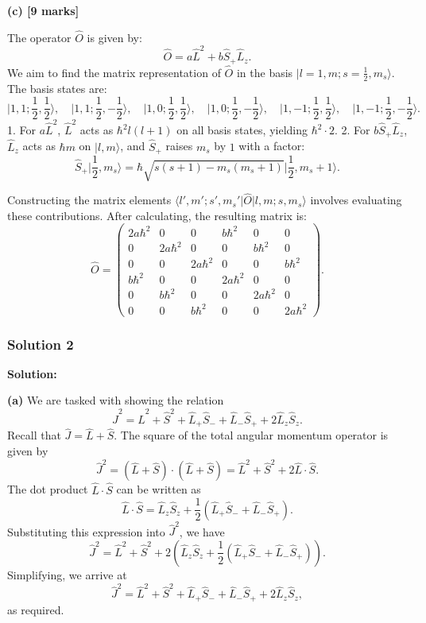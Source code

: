 \documentclass{article}
\begin{document}
\textbf{(c) [9 marks]}  

The operator $\hat{O}$ is given by:  
\[
\hat{O} = a \hat{L}^2 + b \hat{S}_+ \hat{L}_z.
\]  
We aim to find the matrix representation of $\hat{O}$ in the basis $\lvert l = 1, m; s = \frac{1}{2}, m_s \rangle$. The basis states are:  
\[
\lvert 1, 1; \frac{1}{2}, \frac{1}{2} \rangle, \quad \lvert 1, 1; \frac{1}{2}, -\frac{1}{2} \rangle, \quad \lvert 1, 0; \frac{1}{2}, \frac{1}{2} \rangle, \quad \lvert 1, 0; \frac{1}{2}, -\frac{1}{2} \rangle, \quad \lvert 1, -1; \frac{1}{2}, \frac{1}{2} \rangle, \quad \lvert 1, -1; \frac{1}{2}, -\frac{1}{2} \rangle.
\]  
1. For $a \hat{L}^2$, $\hat{L}^2$ acts as $\hbar^2 l(l+1)$ on all basis states, yielding $\hbar^2 \cdot 2$.  
2. For $b \hat{S}_+ \hat{L}_z$, $\hat{L}_z$ acts as $\hbar m$ on $\lvert l, m \rangle$, and $\hat{S}_+$ raises $m_s$ by $1$ with a factor:  
\[
\hat{S}_+ \lvert \frac{1}{2}, m_s \rangle = \hbar \sqrt{s(s+1) - m_s(m_s + 1)} \lvert \frac{1}{2}, m_s + 1 \rangle.
\]  

Constructing the matrix elements $\langle l', m'; s', m_s' \lvert \hat{O} \rvert l, m; s, m_s \rangle$ involves evaluating these contributions. After calculating, the resulting matrix is:  
\[
\hat{O} = 
\begin{pmatrix}
2a\hbar^2 & 0 & 0 & b\hbar^2 & 0 & 0 \\
0 & 2a\hbar^2 & 0 & 0 & b\hbar^2 & 0 \\
0 & 0 & 2a\hbar^2 & 0 & 0 & b\hbar^2 \\
b\hbar^2 & 0 & 0 & 2a\hbar^2 & 0 & 0 \\
0 & b\hbar^2 & 0 & 0 & 2a\hbar^2 & 0 \\
0 & 0 & b\hbar^2 & 0 & 0 & 2a\hbar^2
\end{pmatrix}.
\]  

\subsubsection{Solution 2}

\textbf{Solution:}  

\textbf{(a)}  
We are tasked with showing the relation  
\[
\hat{J}^2 = \hat{L}^2 + \hat{S}^2 + \hat{L}_+ \hat{S}_- + \hat{L}_- \hat{S}_+ + 2 \hat{L}_z \hat{S}_z.
\]  
Recall that $\hat{J} = \hat{L} + \hat{S}$. The square of the total angular momentum operator is given by  
\[
\hat{J}^2 = (\hat{L} + \hat{S}) \cdot (\hat{L} + \hat{S}) = \hat{L}^2 + \hat{S}^2 + 2 \hat{L} \cdot \hat{S}.
\]  
The dot product $\hat{L} \cdot \hat{S}$ can be written as  
\[
\hat{L} \cdot \hat{S} = \hat{L}_z \hat{S}_z + \frac{1}{2}(\hat{L}_+ \hat{S}_- + \hat{L}_- \hat{S}_+).
\]  
Substituting this expression into $\hat{J}^2$, we have  
\[
\hat{J}^2 = \hat{L}^2 + \hat{S}^2 + 2 \left( \hat{L}_z \hat{S}_z + \frac{1}{2} (\hat{L}_+ \hat{S}_- + \hat{L}_- \hat{S}_+) \right).
\]  
Simplifying, we arrive at  
\[
\hat{J}^2 = \hat{L}^2 + \hat{S}^2 + \hat{L}_+ \hat{S}_- + \hat{L}_- \hat{S}_+ + 2 \hat{L}_z \hat{S}_z,
\]  
as required.  
\end{document}
